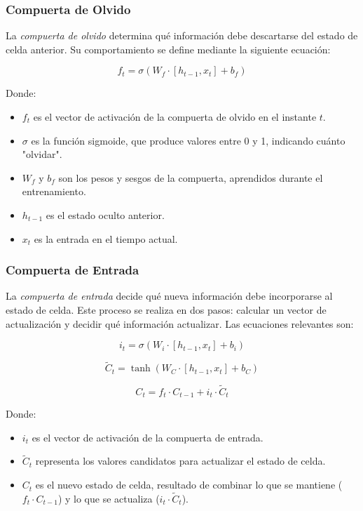 \subsubsection{Compuerta de Olvido}

La \textit{compuerta de olvido} determina qué información debe descartarse del estado de celda anterior. Su comportamiento se define mediante la siguiente ecuación:

\begin{equation}
    f_t = \sigma(W_f \cdot [h_{t-1}, x_t] + b_f)
\end{equation}

Donde:  
\begin{itemize}
    \item \(f_t\) es el vector de activación de la compuerta de olvido en el instante \(t\).  
    \item \(\sigma\) es la función sigmoide, que produce valores entre 0 y 1, indicando cuánto "olvidar".  
    \item \(W_f\) y \(b_f\) son los pesos y sesgos de la compuerta, aprendidos durante el entrenamiento.  
    \item \(h_{t-1}\) es el estado oculto anterior.  
    \item \(x_t\) es la entrada en el tiempo actual.
\end{itemize}

\subsubsection{Compuerta de Entrada}

La \textit{compuerta de entrada} decide qué nueva información debe incorporarse al estado de celda. Este proceso se realiza en dos pasos: calcular un vector de actualización y decidir qué información actualizar. Las ecuaciones relevantes son:

\begin{equation}
    i_t = \sigma(W_i \cdot [h_{t-1}, x_t] + b_i)
\end{equation}

\begin{equation}
    \tilde{C}_t = \tanh(W_C \cdot [h_{t-1}, x_t] + b_C)
\end{equation}

\begin{equation}
    C_t = f_t \cdot C_{t-1} + i_t \cdot \tilde{C}_t
\end{equation}

Donde:  
\begin{itemize}
    \item \(i_t\) es el vector de activación de la compuerta de entrada.  
    \item \(\tilde{C}_t\) representa los valores candidatos para actualizar el estado de celda.  
    \item \(C_t\) es el nuevo estado de celda, resultado de combinar lo que se mantiene (\(f_t \cdot C_{t-1}\)) y lo que se actualiza (\(i_t \cdot \tilde{C}_t\)).
\end{itemize}

